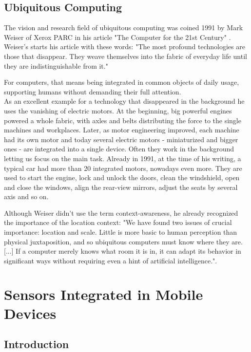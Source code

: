 \subsection{Ubiquitous Computing}

The vision and research field of ubiquitous computing was coined 1991 by Mark Weiser of Xerox PARC in his article "The Computer for the 21st Century" \cite{weiserm1991}. 
Weiser's starts his article with these words:
"The most profound technologies are those that disappear. They weave themselves into the fabric of everyday life until they are indistinguishable from it."

For computers, that means being integrated in common objects of daily usage, supporting humans without demanding their full attention. \\
As an excellent example for a technology that disappeared in the background he uses the vanishing of electric motors. At the beginning, big powerful engines powered a whole fabric, with axles and belts distributing the force to the single machines and workplaces. Later, as motor engineering improved, each machine had its own motor and today several electric motors - miniaturized and bigger ones - are integrated into a single device. Often they work in the background letting us focus on the main task. Already in 1991, at the time of his writing, a typical car had more than 20 integrated motors, nowadays even more. They are used to start the engine, lock and unlock the doors, clean the windshield, open and close the windows, align the rear-view mirrors, adjust the seats by several axis and so on. 

Although Weiser didn't use the term context-awareness, he already recognized the importance of the location context: "We have found two issues of crucial importance: location and scale. Little is more basic to human perception than physical juxtaposition, and so ubiquitous computers must know where they are. [...] If a computer merely knows what room it is in, it can adapt its behavior in significant ways without requiring even a hint of artificial intelligence.".

\section{Sensors Integrated in Mobile Devices}

\subsection{Introduction}

